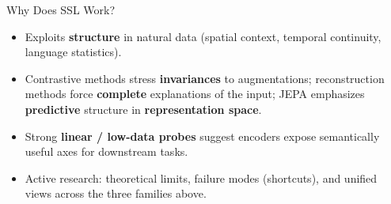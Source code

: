 \begin{frame}{Why Does SSL Work?}
  \begin{itemize}\itemsep0.28em
    \item Exploits \textbf{structure} in natural data (spatial context, temporal continuity, language statistics).
    \item Contrastive methods stress \textbf{invariances} to augmentations; reconstruction methods force \textbf{complete} explanations of the input; JEPA emphasizes \textbf{predictive} structure in \textbf{representation space}.
    \item Strong \textbf{linear / low-data probes} suggest encoders expose semantically useful axes for downstream tasks.
    \item Active research: theoretical limits, failure modes (shortcuts), and unified views across the three families above.
  \end{itemize}
\end{frame}

